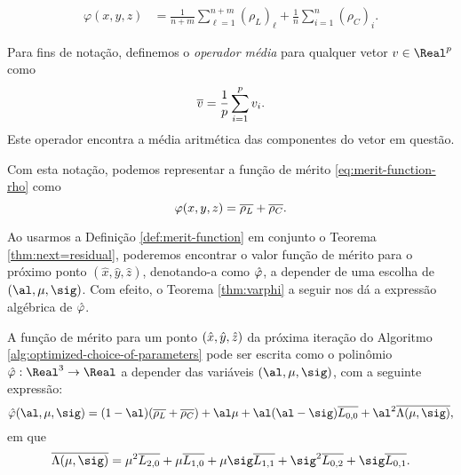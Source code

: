 \begin{align}
\varphi(x,y,z) & = \frac{1}{n+m}\sum_{\ell=1}^{n+m}(\rho_L)_\ell+ 
\frac{1}{n}\sum_{i=1}^{n}(\rho_C)_i.\label{eq:merit-function-rho}
\end{align}

Para fins de notação, definemos o \emph{operador média} para qualquer vetor
$v\in\Real^p$ como \[\overline{v} = \frac{1}{p}\sum_{i=1}^p v_i.\] Este operador
encontra a média aritmética das componentes do vetor em questão. 

Com esta notação, podemos representar a função de mérito
\eqref{eq:merit-function-rho} como
\begin{equation}\label{eq:merit-function-as-sum-bar}
\varphi(x,y,z)  = \overline{\rho_L}+ 
\overline{\rho_C}.
\end{equation}



Ao usarmos a Definição \ref{def:merit-function} em conjunto o Teorema \ref{thm:next=residual}, poderemos encontrar o valor função de mérito para o próximo ponto $(\hat{x},\hat{y},\hat{z})$, denotando-a como $\hat{\varphi}$, a depender de uma
escolha de $(\al,\mu,\sig)$. Com efeito, o Teorema \ref{thm:varphi} a seguir nos dá a expressão algébrica de $\hat{\varphi}$.

\begin{teo}
\label{thm:varphi}  
A função de mérito para um ponto $(\hat{x},\hat{y},\hat{z})$ da próxima iteração do Algoritmo \ref{alg:optimized-choice-of-parameters} pode ser escrita como o {polinômio} 
$\nextphi:\Real^3\to\Real$ a depender das variáveis $(\al,\mu,\sig)$, com a seguinte
expressão:
\begin{equation}
\label{eq:merit-function-al-mu-sig}
\nextphi(\al,\mu,\sig) = (1-\al)(\dbvec{\rho_L} +
\dbvec{\rho_C}) + \al\mu + \al(\al-\sig)\dbvec{L_{0,0}} +
\al^2\dbvec{\Lambda(\mu,\sig)},
\end{equation}
em que 
\begin{equation}
	\label{eq:Lambda-mu-sig}
	\dbvec{\Lambda(\mu,\sig)} = \mu^2
 \dbvec{L_{2,0}} + \mu \dbvec{L_{1,0}} + 	\mu \sig \dbvec{L_{1,1}} +
 \sig^2 \dbvec{L_{0,2}} + \sig \dbvec{L_{0,1}}.
 \end{equation} 
 
  \end{teo}

